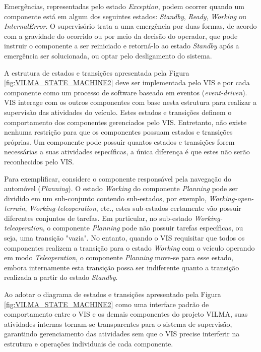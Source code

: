 \documentclass[conference]{IEEEtran}
\begin{document}
Emergências, representadas pelo estado \textit{Exception}, podem ocorrer quando um componente está em algum dos seguintes estados: \textit{Standby}, \textit{Ready}, \textit{Working} ou \textit{InternalError}. O supervisório trata a uma emergência por duas formas, de acordo com a gravidade do ocorrido ou por meio da decisão do operador, que pode instruir o componente a ser reiniciado e retorná-lo ao estado \textit{Standby} após a emergência ser solucionada, ou optar pelo desligamento do sistema.

A estrutura de estados e transições apresentada pela Figura \ref{fig:VILMA_STATE_MACHINE2} deve ser implementada pelo VIS e por cada componente como um processo de software baseado em eventos (\textit{event-driven}).  VIS interage com os outros componentes com base nesta estrutura para realizar a supervisão das atividades do veículo. Estes estados e transições definem o comportamento dos componentes gerenciados pelo VIS. Entretanto, não existe nenhuma restrição para que os componentes possuam estados e transições próprias. Um componente pode possuir quantos estados e transições forem necessárias a suas atividades específicas, a única diferença é que estes não serão reconhecidos pelo VIS. 

Para exemplificar, considere o componente responsável pela navegação do automóvel (\textit{Planning}). O estado \textit{Working} do componente \textit{Planning} pode ser dividido em um sub-conjunto contendo sub-estados, por exemplo, \textit{Working-open-terrain}, \textit{Working-teleoperation}, etc., estes sub-estados certamente vão possuir diferentes conjuntos de tarefas. Em particular, no sub-estado \textit{Working-teleoperation}, o componente \textit{Planning} pode não possuir tarefas específicas, ou seja, uma transição "vazia". No entanto, quando o VIS requisitar que todos os componentes realizem a transição para o estado \textit{Working} com o veículo operando em modo \textit{Teleoperation}, o componente \textit{Planning} move-se para esse estado, embora internamente esta transição possa ser indiferente quanto a transição realizada a partir do estado \textit{Standby}.

Ao adotar o diagrama de estados e transições apresentado pela Figura \ref{fig:VILMA_STATE_MACHINE2} como uma interface padrão de comportamento entre o VIS e os demais componentes do projeto VILMA, suas atividades internas tornam-se transparentes para o sistema de supervisão, garantindo gerenciamento das atividades sem que o VIS precise interferir na estrutura e operações individuais de cada componente.
\end{document}
